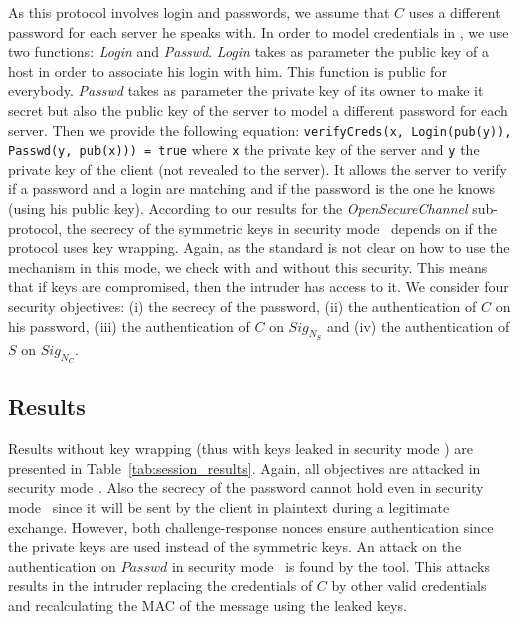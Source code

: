 As this protocol involves login and passwords,  we assume that $C$ uses a
different password for each server he speaks with.  In order to model
credentials in \proverif, we use two functions: {\em Login} and {\em
  Passwd}.  {\em Login} takes as parameter the public key of a host in
order to associate his login with him. This function is public for
everybody.  {\em Passwd} takes as parameter the private key of its
owner to make it secret but also the public key of the server to model
a different password for each server.  Then we provide the following
equation: \texttt{verifyCreds(x, Login(pub(y)), Passwd(y, pub(x))) =
  true} where \texttt{x} the private key of the server and \texttt{y}
the private key of the client (not revealed to the server).  It allows
the server to verify if a password and a login are matching and if the
password is the one he knows (using his public key).
According to our results for the {\em OpenSecureChannel} sub-protocol, the
secrecy of the symmetric keys in security mode \sms~depends on if the protocol
uses key wrapping.
Again, as the \opcua{} standard is not clear on how to use the mechanism in
this mode, we check with and without this security.
This means that if keys are compromised, then the intruder has access to it.
We consider four security objectives: (i) the secrecy of the
password, (ii) the authentication of $C$ on his password, (iii) the
authentication of $C$ on $Sig_{N_{S}}$ and (iv) the authentication of $S$ on
$Sig_{N_{C}}$.

\subsection{Results}

Results without key wrapping (thus with keys leaked in security mode \sms) are
presented in Table~\ref{tab:session_results}.
Again, all objectives are attacked in security mode \smn.
Also the secrecy of the password cannot hold even in security mode \sms~since
it will be sent by the client in plaintext during a legitimate exchange.
However, both challenge-response nonces ensure authentication since the private
keys are used instead of the symmetric keys.
An attack on the authentication on $Passwd$ in security mode \sms~is found by
the tool.
This attacks results in the intruder replacing the credentials of $C$ by other
valid credentials and recalculating the MAC of the message using the leaked keys.

